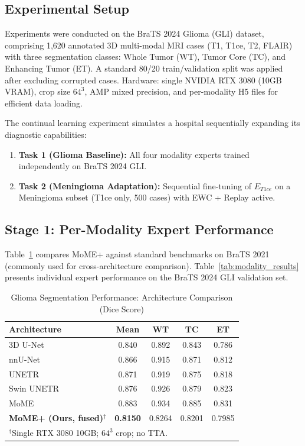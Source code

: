 \documentclass[conference]{IEEEtran}
\begin{document}
\subsection{Experimental Setup}
Experiments were conducted on the BraTS 2024 Glioma (GLI) dataset, comprising 1,620 annotated 3D multi-modal MRI cases (T1, T1ce, T2, FLAIR) with three segmentation classes: Whole Tumor (WT), Tumor Core (TC), and Enhancing Tumor (ET). A standard 80/20 train/validation split was applied after excluding corrupted cases. Hardware: single NVIDIA RTX 3080 (10GB VRAM), crop size $64^3$, AMP mixed precision, and per-modality H5 files for efficient data loading.

The continual learning experiment simulates a hospital sequentially expanding its diagnostic capabilities:
\begin{enumerate}
    \item \textbf{Task 1 (Glioma Baseline):} All four modality experts trained independently on BraTS 2024 GLI.
    \item \textbf{Task 2 (Meningioma Adaptation):} Sequential fine-tuning of $E_{T1ce}$ on a Meningioma subset (T1ce only, 500 cases) with EWC + Replay active.
\end{enumerate}

\subsection{Stage 1: Per-Modality Expert Performance}
Table~\ref{tab:results} compares MoME+ against standard benchmarks on BraTS 2021 (commonly used for cross-architecture comparison). Table~\ref{tab:modality_results} presents individual expert performance on the BraTS 2024 GLI validation set.

\begin{table}[htbp]
\caption{Glioma Segmentation Performance: Architecture Comparison (Dice Score)}
\begin{center}
\begin{tabular}{l c c c c}
\toprule
\textbf{Architecture} & \textbf{Mean} & \textbf{WT} & \textbf{TC} & \textbf{ET} \\
\midrule
3D U-Net \cite{ronneberger2015unet}   & 0.840 & 0.892 & 0.843 & 0.786 \\
nnU-Net \cite{isensee2021nnu}         & 0.866 & 0.915 & 0.871 & 0.812 \\
UNETR \cite{hatamizadeh2022unetr}     & 0.871 & 0.919 & 0.875 & 0.818 \\
Swin UNETR \cite{hatamizadeh2022swin} & 0.876 & 0.926 & 0.879 & 0.823 \\
MoME \cite{zhang2024mome}             & 0.883 & 0.934 & 0.885 & 0.831 \\
\midrule
\textbf{MoME+ (Ours, fused)}$^\dagger$ & \textbf{0.8150} & 0.8264 & 0.8201 & 0.7985 \\
\bottomrule
\multicolumn{5}{l}{$^\dagger$Single RTX 3080 10GB; $64^3$ crop; no TTA.}
\end{tabular}
\label{tab:results}
\end{center}
\end{table}
\end{document}
